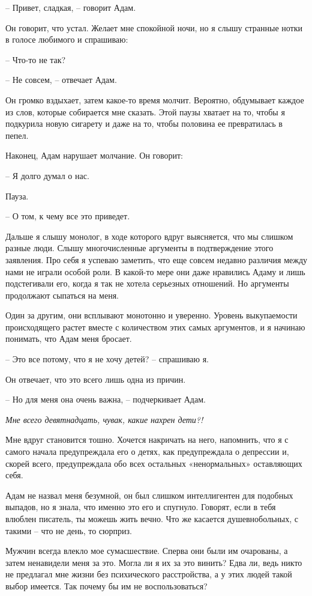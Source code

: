 \documentclass[
]{book}
\begin{document}
-- Привет, сладкая, -- говорит Адам.

Он говорит, что устал. Желает мне спокойной ночи, но я слышу странные нотки в голосе любимого и спрашиваю:

-- Что-то не так?

-- Не совсем, -- отвечает Адам.

Он громко вздыхает, затем какое-то время молчит. Вероятно, обдумывает каждое из слов, которые собирается мне сказать. Этой паузы хватает на то, чтобы я подкурила новую сигарету и даже на то, чтобы половина ее превратилась в пепел.

Наконец, Адам нарушает молчание. Он говорит:

-- Я долго думал о нас.

Пауза.

-- О том, к чему все это приведет.

Дальше я слышу монолог, в ходе которого вдруг выясняется, что мы слишком разные люди. Слышу многочисленные аргументы в подтверждение этого заявления. Про себя я успеваю заметить, что еще совсем недавно различия между нами не играли особой роли. В какой-то мере они даже нравились Адаму и лишь подстегивали его, когда я так не хотела серьезных отношений. Но аргументы продолжают сыпаться на меня.

Один за другим, они всплывают монотонно и уверенно. Уровень выкупаемости происходящего растет вместе с количеством этих самых аргументов, и я начинаю понимать, что Адам меня бросает.

-- Это все потому, что я не хочу детей? -- спрашиваю я.

Он отвечает, что это всего лишь одна из причин.

-- Но для меня она очень важна, -- подчеркивает Адам.

\emph{Мне всего девятнадцать, чувак, какие нахрен дети?!}

Мне вдруг становится тошно. Хочется накричать на него, напомнить, что я с самого начала предупреждала его о детях, как предупреждала о депрессии и, скорей всего, предупреждала обо всех остальных «ненормальных» оставляющих себя.

Адам не назвал меня безумной, он был слишком интеллигентен для подобных выпадов, но я знала, что именно это его и спугнуло. Говорят, если в тебя влюблен писатель, ты можешь жить вечно. Что же касается душевнобольных, с такими -- что не день, то сюрприз.

Мужчин всегда влекло мое сумасшествие. Сперва они были им очарованы, а затем ненавидели меня за это. Могла ли я их за это винить? Едва ли, ведь никто не предлагал мне жизни без психического расстройства, а у этих людей такой выбор имеется. Так почему бы им не воспользоваться?
\end{document}

